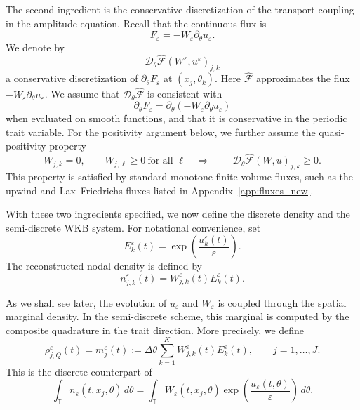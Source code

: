 \documentclass[11pt]{article}
\begin{document}
The second ingredient is the conservative discretization of the transport
coupling in the amplitude equation. Recall that the continuous flux is
\[
F_\varepsilon=-W_\varepsilon\partial_\theta u_\varepsilon .
\]
We denote by
\[
\mathcal D_\theta\widehat{\mathcal F}(W^\varepsilon,u^\varepsilon)_{j,k}
\]
a conservative discretization of \(\partial_\theta F_\varepsilon\) at
\((x_j,\theta_k)\). Here \(\widehat{\mathcal F}\) approximates the flux
\(-W_\varepsilon\partial_\theta u_\varepsilon\). We assume that
\(\mathcal D_\theta\widehat{\mathcal F}\) is consistent with
\[
\partial_\theta F_\varepsilon
=
\partial_\theta(-W_\varepsilon\partial_\theta u_\varepsilon)
\]
when evaluated on smooth functions, and that it is conservative in the
periodic trait variable. For the positivity argument below, we further assume
the quasi-positivity property
\begin{equation}\label{ass:H_flux}
W_{j,k}=0,
\qquad
W_{j,\ell}\ge0\ \text{for all }\ell
\quad\Longrightarrow\quad
-\mathcal D_\theta\widehat{\mathcal F}(W,u)_{j,k}\ge0 .
\end{equation}
This property is satisfied by standard monotone finite volume fluxes, such as
the upwind and Lax--Friedrichs fluxes listed in Appendix~\ref{app:fluxes_new}.

With these two ingredients specified, we now define the discrete density and
the semi-discrete WKB system. For notational convenience, set
\begin{equation}\label{def:E}
E_k^\varepsilon(t)
=
\exp\!\left(\frac{u_k^\varepsilon(t)}{\varepsilon}\right).
\end{equation}
The reconstructed nodal density is defined by
\begin{equation}\label{def:n_reconstructed}
n_{j,k}^\varepsilon(t)
=
W_{j,k}^\varepsilon(t)E_k^\varepsilon(t).
\end{equation}


As we shall see later, the evolution of \(u_\varepsilon\) and
\(W_\varepsilon\) is coupled through the spatial marginal density.  In the
semi-discrete scheme, this marginal is computed by the composite quadrature in
the trait direction.  More precisely, we define
\begin{equation}\label{eq:E_rho}
\rho_{j,Q}^\varepsilon(t)
=
m_j^\varepsilon(t)
:=
\Delta\theta
\sum_{k=1}^K
W_{j,k}^\varepsilon(t)E_k^\varepsilon(t),
\qquad
j=1,\dots,J .
\end{equation}
This is the discrete counterpart of
\[
\int_{\mathbb T}
n_\varepsilon(t,x_j,\theta)\,d\theta
=
\int_{\mathbb T}
W_\varepsilon(t,x_j,\theta)
\exp\!\left(\frac{u_\varepsilon(t,\theta)}{\varepsilon}\right)
\,d\theta .
\]
\end{document}
